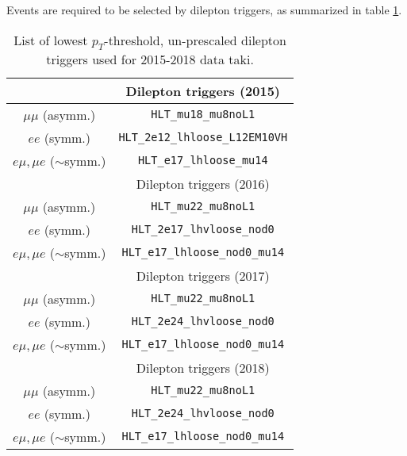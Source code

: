 Events are required to be selected by dilepton triggers, as summarized in table \ref{tbl:trigger}. %

\begin{table}[h!]
 \begin{center}
   \begin{tabular}{cc}
     \toprule
     
     & Dilepton triggers (2015) \\
     \midrule                                                                         
     $\mu\mu$ (asymm.)          & \verb!HLT_mu18_mu8noL1! \\
     $ee$ (symm.)               & \verb!HLT_2e12_lhloose_L12EM10VH! \\
     $e\mu,\mu e$ ($\sim$symm.) & \verb!HLT_e17_lhloose_mu14! \\
     \bottomrule
     
     & Dilepton triggers (2016) \\
     \midrule
     $\mu\mu$ (asymm.)                   & \verb!HLT_mu22_mu8noL1! \\
     $ee$ (symm.)                        & \verb!HLT_2e17_lhvloose_nod0! \\
     $e\mu,\mu e$ ($\sim$symm.)          & \verb!HLT_e17_lhloose_nod0_mu14! \\
     \bottomrule

     & Dilepton triggers (2017) \\
     \midrule                                                                                   
     $\mu\mu$ (asymm.)                   & \verb!HLT_mu22_mu8noL1! \\
     $ee$ (symm.)                        & \verb!HLT_2e24_lhvloose_nod0! \\
     $e\mu,\mu e$ ($\sim$symm.)          & \verb!HLT_e17_lhloose_nod0_mu14! \\                                     
     \bottomrule

     & Dilepton triggers (2018) \\
     \midrule
     $\mu\mu$ (asymm.)                   & \verb!HLT_mu22_mu8noL1! \\                                            
     $ee$ (symm.)                        & \verb!HLT_2e24_lhvloose_nod0! \\                                              
     $e\mu,\mu e$ ($\sim$symm.)          & \verb!HLT_e17_lhloose_nod0_mu14! \\                                           
     \bottomrule 
   \end{tabular}                                                                                                         
   \caption{\label{tbl:trigger} List of lowest $p_{T}$-threshold, un-prescaled dilepton triggers used for 2015-2018 data taki\ng.}
 \end{center}
\end{table}

